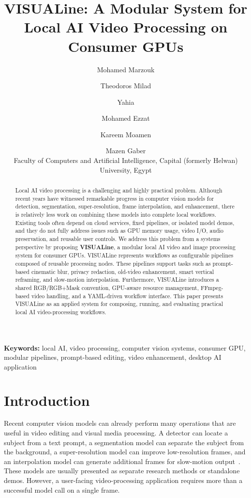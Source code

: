 \documentclass[11pt,a4paper]{article}
\title{\textbf{VISUALine: A Modular System for Local AI Video Processing on Consumer GPUs}}
\author{
Mohamed Marzouk \and Theodoros Milad \and Yahia \and Mohamed Ezzat \and Kareem Moamen \and Mazen Gaber\\
\small Faculty of Computers and Artificial Intelligence, Capital (formerly Helwan) University, Egypt
}
\date{}
\begin{document}
\maketitle

\begin{abstract}
Local AI video processing is a challenging and highly practical problem. Although recent years have witnessed remarkable progress in computer vision models for detection, segmentation, super-resolution, frame interpolation, and enhancement, there is relatively less work on combining these models into complete local workflows. Existing tools often depend on cloud services, fixed pipelines, or isolated model demos, and they do not fully address issues such as GPU memory usage, video I/O, audio preservation, and reusable user controls. We address this problem from a systems perspective by proposing \textbf{VISUALine}, a modular local AI video and image processing system for consumer GPUs. VISUALine represents workflows as configurable pipelines composed of reusable processing nodes. These pipelines support tasks such as prompt-based cinematic blur, privacy redaction, old-video enhancement, smart vertical reframing, and slow-motion interpolation. Furthermore, VISUALine introduces a shared RGB/RGB+Mask convention, GPU-aware resource management, FFmpeg-based video handling, and a YAML-driven workflow interface. This paper presents VISUALine as an applied system for composing, running, and evaluating practical local AI video-processing workflows.
\end{abstract}

\noindent\textbf{Keywords:} local AI, video processing, computer vision systems, consumer GPU, modular pipelines, prompt-based editing, video enhancement, desktop AI application

\section{Introduction}

Recent computer vision models can already perform many operations that are useful in video editing and visual media processing. A detector can locate a subject from a text prompt, a segmentation model can separate the subject from the background, a super-resolution model can improve low-resolution frames, and an interpolation model can generate additional frames for slow-motion output~\cite{liu2023groundingdino,ravi2024sam2,wang2021realesrgan,huang2022rife}. These models are usually presented as separate research methods or standalone demos. However, a user-facing video-processing application requires more than a successful model call on a single frame.
\end{document}
